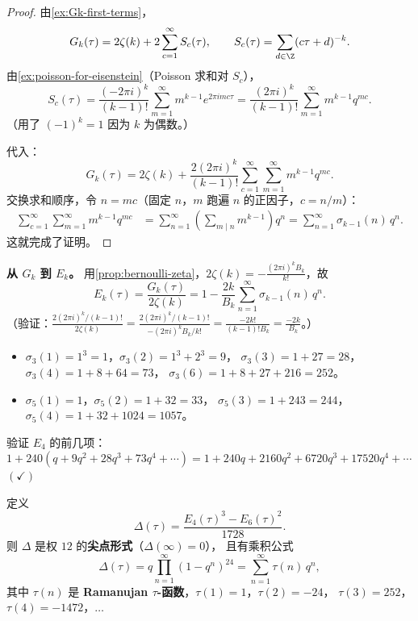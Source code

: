 \begin{proof}
由\cref{ex:Gk-first-terms}，
\[
  G_k(\tau) = 2\zeta(k) + 2\sum_{c=1}^{\infty} S_c(\tau),
  \qquad S_c(\tau) = \sum_{d \in \Z} (c\tau + d)^{-k}.
\]
由\cref{ex:poisson-for-eisenstein}（Poisson 求和对 $S_c$），
\[
  S_c(\tau) = \frac{(-2\pi i)^k}{(k-1)!} \sum_{m=1}^{\infty} m^{k-1} e^{2\pi i mc\tau}
  = \frac{(2\pi i)^k}{(k-1)!} \sum_{m=1}^{\infty} m^{k-1} q^{mc}.
\]
（用了 $(-1)^k = 1$ 因为 $k$ 为偶数。）

代入：
\[
  G_k(\tau)
  = 2\zeta(k) + \frac{2(2\pi i)^k}{(k-1)!}
    \sum_{c=1}^{\infty} \sum_{m=1}^{\infty} m^{k-1} q^{mc}.
\]
交换求和顺序，令 $n = mc$（固定 $n$，$m$ 跑遍 $n$ 的正因子，$c = n/m$）：
\begin{align}
  \sum_{c=1}^{\infty} \sum_{m=1}^{\infty} m^{k-1} q^{mc}
  &= \sum_{n=1}^{\infty} \left(\sum_{m \mid n} m^{k-1}\right) q^n
  = \sum_{n=1}^{\infty} \sigma_{k-1}(n)\, q^n.
\end{align}
这就完成了证明。
\end{proof}

\textbf{从 $G_k$ 到 $E_k$。}
用\cref{prop:bernoulli-zeta}，$2\zeta(k) = -\frac{(2\pi i)^k B_k}{k!}$，故
\[
  E_k(\tau)
  = \frac{G_k(\tau)}{2\zeta(k)}
  = 1 - \frac{2k}{B_k} \sum_{n=1}^{\infty} \sigma_{k-1}(n)\, q^n.
\]
（验证：$\frac{2(2\pi i)^k/(k-1)!}{2\zeta(k)} = \frac{2(2\pi i)^k/(k-1)!}{-(2\pi i)^k B_k/k!}
= \frac{-2k!}{(k-1)! B_k} = \frac{-2k}{B_k}$。）

\begin{example}
\label{ex:sigma-computation}
\leavevmode
\begin{itemize}
  \item $\sigma_3(1) = 1^3 = 1$，$\sigma_3(2) = 1^3 + 2^3 = 9$，
    $\sigma_3(3) = 1 + 27 = 28$，$\sigma_3(4) = 1 + 8 + 64 = 73$，
    $\sigma_3(6) = 1 + 8 + 27 + 216 = 252$。
  \item $\sigma_5(1) = 1$，$\sigma_5(2) = 1 + 32 = 33$，
    $\sigma_5(3) = 1 + 243 = 244$，$\sigma_5(4) = 1 + 32 + 1024 = 1057$。
\end{itemize}

验证 $E_4$ 的前几项：
$1 + 240(q + 9q^2 + 28q^3 + 73q^4 + \cdots)
= 1 + 240q + 2160q^2 + 6720q^3 + 17520q^4 + \cdots$ \quad $(\checkmark)$
\end{example}

\begin{proposition}[$E_4, E_6$ 与 $\Delta$]
\label{prop:E4-E6-Delta}
定义
\[
  \Delta(\tau) = \frac{E_4(\tau)^3 - E_6(\tau)^2}{1728}.
\]
则 $\Delta$ 是权 $12$ 的\textbf{尖点形式}（$\Delta(\infty) = 0$），
且有乘积公式
\[
  \Delta(\tau) = q \prod_{n=1}^{\infty}(1-q^n)^{24}
  = \sum_{n=1}^{\infty} \tau(n)\, q^n,
\]
其中 $\tau(n)$ 是 \textbf{Ramanujan $\tau$-函数}，$\tau(1) = 1$，$\tau(2) = -24$，
$\tau(3) = 252$，$\tau(4) = -1472$，$\ldots$
\end{proposition}

